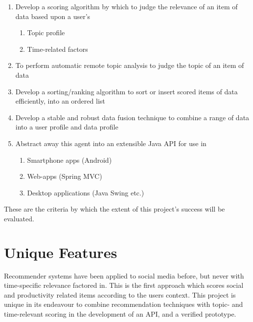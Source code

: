 \begin{enumerate}
	\item Develop a scoring algorithm by which to judge the relevance of an item of data based upon a user's
	\begin{enumerate}
		\item Topic profile
		\item Time-related factors
	\end{enumerate}
	\item To perform automatic remote topic analysis to judge the topic of an item of data
	\item Develop a sorting/ranking algorithm to sort or insert scored items of data efficiently, into an ordered list
	\item Develop a stable and robust data fusion technique to combine a range of data into a user profile and data profile
	\item Abstract away this agent into an extensible Java API for use in
	\begin{enumerate}
		\item Smartphone apps (Android)
		\item Web-apps (Spring MVC)
		\item Desktop applications (Java Swing etc.)
	\end{enumerate}
\end{enumerate}

These are the criteria by which the extent of this project's success will be evaluated.

\section{Unique Features}

Recommender systems have been applied to social media before, but never with time-specific relevance factored in. This is the first approach which scores social and productivity related items according to the users context. This project is unique in its endeavour to combine recommendation techniques with topic- and time-relevant scoring in the development of an API, and a verified prototype.